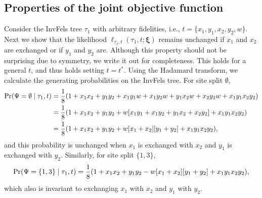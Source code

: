 \subsection*{Properties of the joint objective function}

Consider the InvFels tree $\tau_1$ with arbitrary fidelities, i.e., $t=\{x_1,y_1,x_2,y_2,w\}$.
Next we show that the likelihood $\ell_{\tau_1,t}(\tau_1, t; \boldsymbol\xi)$ remains unchanged if $x_1$ and $x_2$ are exchanged or if $y_1$ and $y_2$ are.
Although this property should not be surprising due to symmetry, we write it out for completeness.
This holds for a general $t$, and thus holds setting $t=t^*$.
Using the Hadamard transform, we calculate the generating probabilities on the InvFels tree.
For site split $\emptyset$,
\begin{align*}
    \Pr(\Psi=\emptyset\mid \tau_1, t) & = \frac{1}{8} (1 + x_1x_2 +  y_1y_2 +  x_1y_1w + x_1y_2w + y_1x_2w + x_2y_2w + x_1y_1x_2y_2) \\
                                              & = \frac{1}{8} (1 + x_1x_2 +  y_1y_2 +  w[x_1y_1 + x_1y_2 + y_1x_2 + x_2y_2] + x_1y_1x_2y_2) \\
                                              & = \frac{1}{8} (1 + x_1x_2 +  y_1y_2 +  w[x_1 + x_2][y_1 + y_2] + x_1y_1x_2y_2),
\end{align*}
and this probability is unchanged when $x_1$ is exchanged with $x_2$ and $y_1$ is exchanged with $y_2$.
Similarly, for site split $\{1,3\}$,
\[
    \Pr(\Psi=\{1,3\}\mid \tau_1, t) = \frac{1}{8} (1 + x_1x_2 +  y_1y_2 -  w[x_1 + x_2][y_1 + y_2] + x_1y_1x_2y_2),
\]
which also is invariant to exchanging $x_1$ with $x_2$ and $y_1$ with $y_2$.

